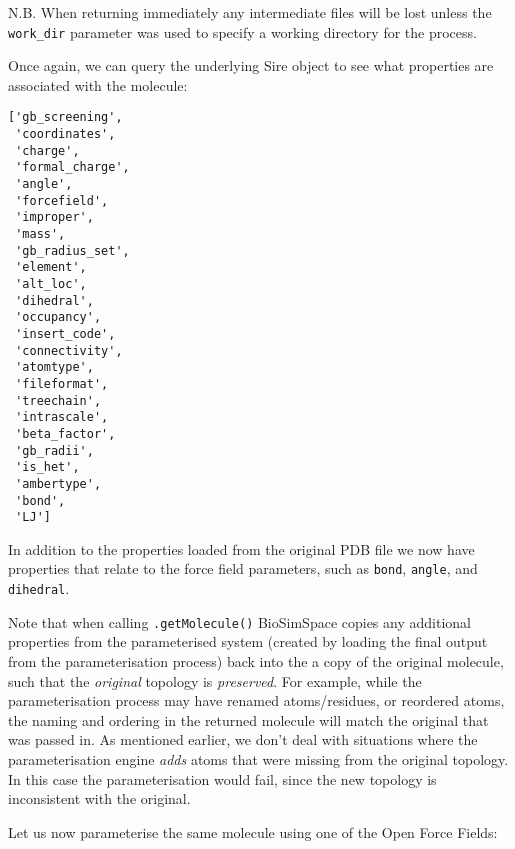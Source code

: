 N.B. When returning immediately any intermediate files will be lost
unless the \texttt{work\_dir} parameter was used to specify a working
directory for the process.

Once again, we can query the underlying Sire object to see what
properties are associated with the molecule:

\begin{Shaded}
\begin{Highlighting}[]
\end{Highlighting}
\end{Shaded}

\begin{verbatim}
['gb_screening',
 'coordinates',
 'charge',
 'formal_charge',
 'angle',
 'forcefield',
 'improper',
 'mass',
 'gb_radius_set',
 'element',
 'alt_loc',
 'dihedral',
 'occupancy',
 'insert_code',
 'connectivity',
 'atomtype',
 'fileformat',
 'treechain',
 'intrascale',
 'beta_factor',
 'gb_radii',
 'is_het',
 'ambertype',
 'bond',
 'LJ']
\end{verbatim}

In addition to the properties loaded from the original PDB file we now
have properties that relate to the force field parameters, such as
\texttt{bond}, \texttt{angle}, and \texttt{dihedral}.

Note that when calling \texttt{.getMolecule()} BioSimSpace copies any
additional properties from the parameterised system (created by loading
the final output from the parameterisation process) back into the a copy
of the original molecule, such that the \emph{original} topology is
\emph{preserved}. For example, while the parameterisation process may
have renamed atoms/residues, or reordered atoms, the naming and ordering
in the returned molecule will match the original that was passed in. As
mentioned earlier, we don't deal with situations where the
parameterisation engine \emph{adds} atoms that were missing from the
original topology. In this case the parameterisation would fail, since
the new topology is inconsistent with the original.

Let us now parameterise the same molecule using one of the Open Force
Fields:

\begin{Shaded}
\begin{Highlighting}[]
\OperatorTok{=}
\end{Highlighting}
\end{Shaded}

